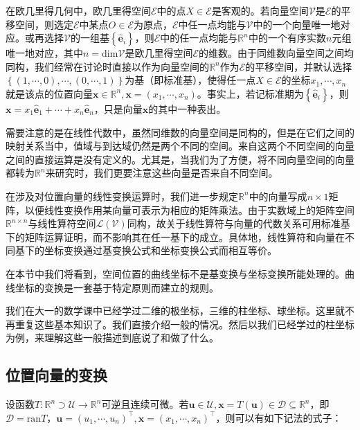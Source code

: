\documentclass[main.tex]{subfiles}
\begin{document}
在欧几里得几何中，欧几里得空间$\mathcal{E}$中的点$X\in\mathcal{E}$是客观的。若向量空间$\mathcal{V}$是$\mathcal{E}$的平移空间，则选定$\mathcal{E}$中某点$O\in\mathcal{E}$为原点，$\mathcal{E}$中任一点均能与$\mathcal{V}$中的一个向量唯一地对应。或再选择$\mathcal{V}$的一组基$\left\{\mathbf{\hat{e}}_i\right\}$，则$\mathcal{E}$中的任一点均能与$\mathbb{R}^n$中的一个有序实数$n$元组唯一地对应，其中$n=\mathrm{dim}\mathcal{V}$是欧几里得空间$\mathcal{E}$的维数。由于同维数向量空间之间均同构，我们经常在讨论时直接以作为向量空间的$\mathbb{R}^n$作为$\mathcal{E}$的平移空间，并默认选择$\left\{\left(1,\cdots,0\right),\cdots,\left(0,\cdots,1\right)\right\}$为基（即标准基），使得任一点$X\in\mathcal{E}$的坐标$x_1,\cdots,x_n$就是该点的位置向量$\mathbf{x}\in\mathbb{R}^n,\mathbf{x}=\left(x_1,\cdots,x_n\right)$。事实上，若记标准期为$\left\{\mathbf{\hat{e}}_i\right\}$，则$\mathbf{x}=x_1\mathbf{\hat{e}}_1+\cdots+x_n\mathbf{\hat{e}}_n$，只是向量$\mathbf{x}$的其中一种表出。

需要注意的是在线性代数中，虽然同维数的向量空间是同构的，但是在它们之间的映射关系当中，值域与到达域仍然是两个不同的空间。来自这两个不同空间的向量之间的直接运算是没有定义的。尤其是，当我们为了方便，将不同向量空间的向量都转为$\mathbb{R}^n$来研究时，我们更要注意这些向量是否来自不同空间。

在涉及对位置向量的线性变换运算时，我们进一步规定$\mathbb{R}^n$中的向量写成$n\times 1$矩阵，以便线性变换作用某向量可表示为相应的矩阵乘法。由于实数域上的矩阵空间$\mathbb{R}^{n\times n}$与线性算符空间$\mathcal{L}\left(\mathcal{V}\right)$同构，故关于线性算符与向量的代数关系可用标准基下的矩阵运算证明，而不影响其在任一基下的成立。具体地，线性算符和向量在不同基下的坐标变换通过基变换公式和坐标变换公式而相互等价。

在本节中我们将看到，空间位置的曲线坐标不是基变换与坐标变换所能处理的。曲线坐标的变换是一套基于特定原则而建立的规则。

我们在大一的数学课中已经学过二维的极坐标，三维的柱坐标、球坐标。这里就不再重复这些基本知识了。我们直接介绍一般的情况。然后以我们已经学过的柱坐标为例，来理解这些一般描述到底说了和做了什么。

\subsection{位置向量的变换}
设函数$T:\mathbb{R}^n\supset\mathcal{U}\rightarrow\mathbb{R}^n$可逆且连续可微。若$\mathbf{u}\in\mathcal{U},\mathbf{x}=T\left(\mathbf{u}\right)\in\mathcal{D}\subseteq\mathbb{R}^n$，即$\mathcal{D}=\mathrm{ran}T$，$\mathbf{u}=\left(u_1,\cdots,u_n\right)^\intercal,\mathbf{x}=\left(x_1,\cdots,x_n\right)^\intercal$，则可以有如下记法的式子：
\end{document}
